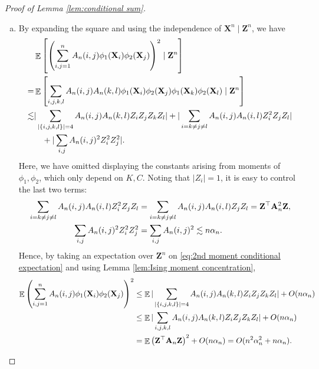 \documentclass[10pt,a4paper]{amsart}
\DeclareMathOperator{\EE}{\mathbb{E}}
\DeclareMathOperator{\sumij}{\sum_{\mathnormal{ i,j}=1}^{\mathnormal n}}
\newcommand{\A}{\mathbf{A}}
\newcommand{\X}{\mathbf{X}}
\newcommand{\Z}{\mathbf{Z}}
\newcommand{\an}{\alpha_{\mathnormal n}}
\begin{document}
\begin{proof}[Proof of Lemma \ref{lem:conditional sum}]
\begin{enumerate}[(a)]
    \item By expanding the square and using the independence of $\X^n \mid \Z^n$, we have
    \begin{equation}\label{eq:2nd moment conditional expectation}
    \begin{aligned}
        &\EE \left[ \left( \sumij A_n(i,j) \phi_1(\X_i) \phi_2(\X_j) \right)^2 \mid \Z^n \right] \\
        =&  \EE \left[ \sum_{i,j,k,l} A_n(i,j) A_n(k,l) \phi_1(\X_i) \phi_2(\X_j) \phi_1(\X_k) \phi_2(\X_l) \mid \Z^n \right]  \\
        \lesssim& |\sum_{|\{i,j,k,l\}|=4} A_n(i,j) A_n(k,l) Z_i Z_j Z_k Z_l| + |\sum_{i=k \neq j \neq l} A_n(i,j) A_n(i,l) Z_i^2 Z_j Z_l| \\
        & \quad + |\sum_{i, j} A_n(i,j)^2 Z_i^2 Z_j^2|.
    \end{aligned}
    \end{equation}
    Here, we have omitted displaying the constants arising from moments of $\phi_1, \phi_2$, which only depend on $K, C$.
    Noting that $|Z_i| = 1$, it is easy to control the last two terms:
    \begin{align*}
        \sum_{i=k \neq j \neq l} A_n(i,j) A_n(i,l) Z_i^2 Z_j Z_l &= \sum_{i=k \neq j \neq l} A_n(i,j) A_n(i,l) Z_j Z_l = \Z^\top \A_n^2 \Z, \\
        \sum_{i, j} A_n(i,j)^2 Z_i^2 Z_j^2 &= \sum_{i, j} A_n(i,j)^2 \lesssim n\an.
    \end{align*}
    Hence, by taking an expectation over $\Z^n$ on \eqref{eq:2nd moment conditional expectation} and using Lemma \ref{lem:Ising moment concentration},
    \begin{align*}
        \EE \left( \sumij A_n(i,j) \phi_1(\X_i) \phi_2(\X_j) \right)^2 &\le \EE |\sum_{|\{i,j,k,l\}|=4} A_n(i,j) A_n(k,l) Z_i Z_j Z_k Z_l| + O(n\an) \\
        &\le \EE |\sum_{i,j,k,l} A_n(i,j) A_n(k,l) Z_i Z_j Z_k Z_l| + O(n\an) \\
        &= \EE \left(\Z^\top \A_n \Z \right)^2 + O(n\an) = O(n^2 \alpha_n^2 + n\an).
    \end{align*}
    \end{enumerate}
    \end{proof} %
\end{document}
